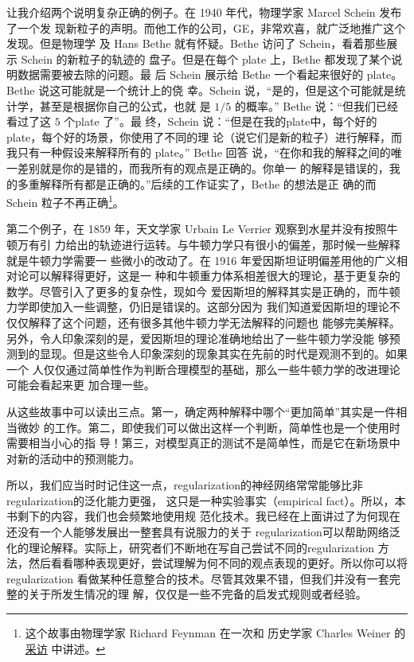 让我介绍两个说明复杂正确的例子。在 1940 年代，物理学家 Marcel Schein 发布了一个发
现新粒子的声明。而他工作的公司，GE，非常欢喜，就广泛地推广这个发现。但是物理学
及 Hans Bethe 就有怀疑。Bethe 访问了 Schein，看着那些展示 Schein 的新粒子的轨迹的
盘子。但是在每个 plate 上，Bethe 都发现了某个说明数据需要被去除的问题。最
后 Schein 展示给 Bethe 一个看起来很好的 plate。Bethe 说这可能就是一个统计上的侥
幸。Schein 说，“是的，但是这个可能就是统计学，甚至是根据你自己的公式，也就
是 $1/5$ 的概率。” Bethe 说：“但我们已经看过了这 $5$ 个plate 了”。最
终，Schein 说：“但是在我的plate中，每个好的plate，每个好的场景，你使用了不同的理
论（说它们是新的粒子）进行解释，而我只有一种假设来解释所有的 plate。” Bethe 回答
说，“在你和我的解释之间的唯一差别就是你的是错的，而我所有的观点是正确的。你单一
的解释是错误的，我的多重解释所有都是正确的。”后续的工作证实了，Bethe 的想法是正
确的而 Schein 粒子不再正确\footnote{这个故事由物理学家 Richard Feynman 在一次和
历史学家 Charles Weiner 的%
  \href{https://www.aip.org/history-programs/niels-bohr-library/oral-histories/5020-4}{采访}%
  中讲述。}。

第二个例子，在 1859 年，天文学家 Urbain Le Verrier 观察到水星并没有按照牛顿万有引
力给出的轨迹进行运转。与牛顿力学只有很小的偏差，那时候一些解释就是牛顿力学需要一
些微小的改动了。在 1916 年爱因斯坦证明偏差用他的广义相对论可以解释得更好，这是一
种和牛顿重力体系相差很大的理论，基于更复杂的数学。尽管引入了更多的复杂性，现如今
爱因斯坦的解释其实是正确的，而牛顿力学即使加入一些调整，仍旧是错误的。这部分因为
我们知道爱因斯坦的理论不仅仅解释了这个问题，还有很多其他牛顿力学无法解释的问题也
能够完美解释。另外，令人印象深刻的是，爱因斯坦的理论准确地给出了一些牛顿力学没能
够预测到的显现。但是这些令人印象深刻的现象其实在先前的时代是观测不到的。如果一个
人仅仅通过简单性作为判断合理模型的基础，那么一些牛顿力学的改进理论可能会看起来更
加合理一些。

从这些故事中可以读出三点。第一，确定两种解释中哪个“更加简单”其实是一件相当微妙
的工作。第二，即使我们可以做出这样一个判断，简单性也是一个使用时需要相当小心的指
导！第三，对模型真正的测试不是简单性，而是它在新场景中对新的活动中的预测能力。

所以，我们应当时时记住这一点，\gls*{regularization}的神经网络常常能够比非\gls*{regularization}的泛化能力更强，
这只是一种实验事实（empirical fact）。所以，本书剩下的内容，我们也会频繁地使用规
范化技术。我已经在上面讲过了为何现在还没有一个人能够发展出一整套具有说服力的关于
\gls*{regularization}可以帮助网络泛化的理论解释。实际上，研究者们不断地在写自己尝试不同的\gls*{regularization}
方法，然后看看哪种表现更好，尝试理解为何不同的观点表现的更好。所以你可以将\gls*{regularization}
看做某种任意整合的技术。尽管其效果不错，但我们并没有一套完整的关于所发生情况的理
解，仅仅是一些不完备的启发式规则或者经验。

